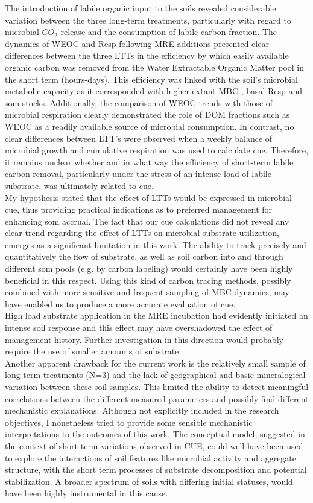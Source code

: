 The introduction of labile organic input to the soils revealed considerable variation between the three long-term treatments, particularly with regard to microbial $ CO_2 $ release and the consumption of labile carbon fraction. The dynamics of WEOC and Resp following MRE additions presented clear differences between the three LTTs in the efficiency by which easily available organic carbon was removed from the Water Extractable Organic Matter pool in the short term (hours-days). This efficiency was linked with the soil's microbial metabolic capacity as it corresponded with higher extant MBC , basal Resp and \gls{som} stocks. Additionally, the comparison of WEOC trends with those of microbial respiration clearly demonstrated the role of DOM fractions such as WEOC as a readily available source of microbial consumption. In contrast, no clear differences between LTT's were observed when a weekly balance of microbial growth and cumulative respiration was used to calculate \gls{cue}. Therefore, it remains unclear whether and in what way the efficiency of short-term labile carbon removal, particularly under the stress of an intense load of labile substrate, was ultimately related to \gls{cue}.\\
My hypothesis stated that the effect of LTTs would be expressed in microbial \gls{cue}, thus providing practical indications as to preferred management for enhancing \gls{som} accrual. The fact that our \gls{cue} calculations did not reveal any clear trend regarding the effect of  LTTs on microbial substrate utilization, emerges as a significant limitation in this work. The ability to track precisely and quantitatively the flow of substrate, as well as soil carbon into and through different \gls{som} pools (e.g. by carbon labeling) would certainly have been highly beneficial in this respect. Using this kind of carbon tracing methods, possibly combined with more sensitive and frequent sampling of MBC dynamics, may have enabled us to produce a more accurate evaluation of \gls{cue}.\\
High load substrate application in the MRE incubation had evidently initiated an intense soil response and this effect may have overshadowed the effect of management history. Further investigation in this direction would probably require the use of smaller amounts of substrate. \\
Another apparent drawback for the current work is the relatively small sample of long-term treatments (N=3) and the lack of geographical and basic mineralogical variation between these soil samples. This limited the ability to detect meaningful correlations between the different measured parameters and possibly find different mechanistic explanations. Although not explicitly included in the research objectives, I nonetheless tried to provide some sensible mechanistic interpretations to the outcomes of this work. The conceptual model, suggested in the context of short term variations observed in CUE, could well have been used to explore the interactions of soil features like microbial activity and aggregate structure, with the short term processes of substrate decomposition and potential stabilization. A broader spectrum of soils with differing initial statuses, would have been highly instrumental in this cause. 

